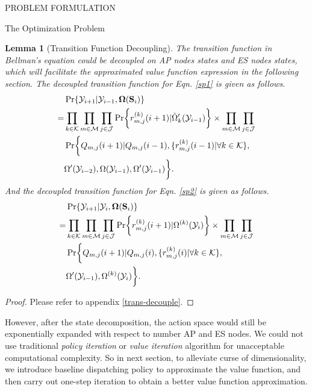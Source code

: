 \documentclass[10pt, conference, letterpaper]{IEEEtran}
\newtheorem{lemma}{Lemma}
\DeclarePairedDelimiter{\set}{\{}{\}}
\DeclarePairedDelimiter{\Brace}{\bigg\{}{\bigg\}}
\newcommand{\apSet}{\mathcal{K}}
\newcommand{\esSet}{\mathcal{M}}
\newcommand{\jSpace}{\mathcal{J}}
\newcommand{\Stat}{\mathbf{S}}
\newcommand{\Obsv}{\mathcal{Y}}
\newcommand{\Policy}{\boldsymbol{\Omega}}
\begin{document}
\begin{section}{PROBLEM FORMULATION}
\begin{subsection}{The Optimization Problem}
            \begin{lemma}[Transition Function Decoupling]
                The transition function in Bellman's equation could be decoupled on AP nodes states and ES nodes states, which will facilitate the approximated value function expression in the following section.
                The decoupled transition function for Eqn. \ref{sp1} is given as follows.
                \begin{align}
                    & \Pr\{\Obsv_{i+1}|\Obsv_{i-1}, \Policy(\Stat_{i})\}
                    \nonumber\\
                    =& \prod_{k\in\apSet}\prod_{m\in\esSet}\prod_{j\in\jSpace}
                            \Pr\Brace{r^{(k)}_{m,j}(i+1)|\tilde{\Omega}'_k(\Obsv_{i-1})}
                            \times \prod_{m\in\esSet}\prod_{j\in\jSpace}
                        \nonumber\\
                        & \Pr\Brace{Q_{m,j}(i+1)|Q_{m,j}(i-1), \set{r^{(k)}_{m,j}(i-1)|\forall k\in\apSet},
                        \nonumber\\
                        & \Omega'(\Obsv_{i-2}), \Omega(\Obsv_{i-1}), \Omega'(\Obsv_{i-1})}.
                \end{align}
                And the decoupled transition function for Eqn. \ref{sp2} is given as follows.
                \begin{align}
                    & \Pr\{\Obsv_{i+1}|\Obsv_{i}, \Policy(\Stat_{i})\}
                    \nonumber\\
                    =& \prod_{k\in\apSet}\prod_{m\in\esSet}\prod_{j\in\jSpace}
                            \Pr\Brace{ r^{(k)}_{m,j}(i+1) | \Omega^{(k)}(\Obsv_i) }
                            \times \prod_{m\in\esSet}\prod_{j\in\jSpace}
                        \nonumber\\
                        & \Pr\Brace{Q_{m,j}(i+1)|Q_{m,j}(i), \set{r^{(k)}_{m,j}(i)|\forall k\in\apSet},
                        \nonumber\\
                        & \Omega'(\Obsv_{i-1}), \Omega^{(k)}(\Obsv_{i})}.
                \end{align}
            \end{lemma}
            \begin{proof}
                Please refer to appendix \ref{trans-decouple}.
            \end{proof}

            However, after the state decomposition, the action space would still be exponentially expanded with respect to number AP and ES nodes. We could not use traditional \emph{policy iteration} or \emph{value iteration} algorithm \cite{sutton1998introduction} for unacceptable computational complexity.
            So in next section, to alleviate curse of dimensionality, we introduce baseline dispatching policy to approximate the value function, and then carry out one-step iteration to obtain a better value function approximation.
        \end{subsection}
    \end{section}
\end{document}
